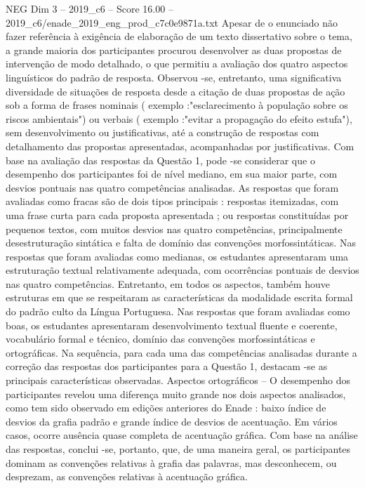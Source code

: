 \begin{textsample}{NEG Dim 3 – 2019\_c6 – Score 16.00 – 2019\_c6/enade\_2019\_eng\_prod\_c7c0e9871a.txt}
Apesar de o enunciado não fazer referência à exigência de elaboração de um texto dissertativo sobre o tema, a grande maioria dos participantes procurou desenvolver as duas propostas de intervenção de modo detalhado, o que permitiu a avaliação dos quatro aspectos linguísticos do padrão de resposta.
Observou -se, entretanto, uma significativa diversidade de situações de resposta desde a citação de duas propostas de ação sob a forma de frases nominais ( exemplo :"esclarecimento à população sobre os riscos ambientais") ou verbais ( exemplo :"evitar a propagação do efeito estufa"), sem desenvolvimento ou justificativas, até a construção de respostas com detalhamento das propostas apresentadas, acompanhadas por justificativas.
Com base na avaliação das respostas da Questão 1, pode -se considerar que o desempenho dos participantes foi de nível mediano, em sua maior parte, com desvios pontuais nas quatro competências analisadas.
As respostas que foram avaliadas como fracas são de dois tipos principais : respostas itemizadas, com uma frase curta para cada proposta apresentada ; ou respostas constituídas por pequenos textos, com muitos desvios nas quatro competências, principalmente desestruturação sintática e falta de domínio das convenções morfossintáticas.
Nas respostas que foram avaliadas como medianas, os estudantes apresentaram uma estruturação textual relativamente adequada, com ocorrências pontuais de desvios nas quatro competências.
Entretanto, em todos os aspectos, também houve estruturas em que se respeitaram as características da modalidade escrita formal do padrão culto da Língua Portuguesa.
Nas respostas que foram avaliadas como boas, os estudantes apresentaram desenvolvimento textual fluente e coerente, vocabulário formal e técnico, domínio das convenções morfossintáticas e ortográficas.
Na sequência, para cada uma das competências analisadas durante a correção das respostas dos participantes para a Questão 1, destacam -se as principais características observadas.
Aspectos ortográficos – O desempenho dos participantes revelou uma diferença muito grande nos dois aspectos analisados, como tem sido observado em edições anteriores do Enade : baixo índice de desvios da grafia padrão e grande índice de desvios de acentuação.
Em vários casos, ocorre ausência quase completa de acentuação gráfica.
Com base na análise das respostas, conclui -se, portanto, que, de uma maneira geral, os participantes dominam as convenções relativas à grafia das palavras, mas desconhecem, ou desprezam, as convenções relativas à acentuação gráfica.

\end{textsample}
